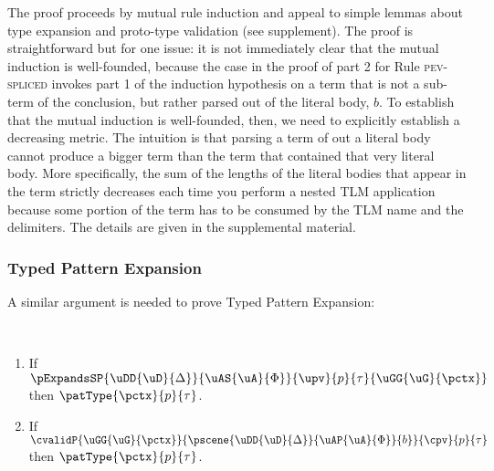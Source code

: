 \documentclass[acmsmall,10pt,review,anonymous]{acmart}\settopmatter{printfolios=true}
\begin{document}
The proof proceeds by mutual rule induction and appeal to simple lemmas about type expansion and proto-type validation (see supplement). The proof is straightforward but for one issue: it is not immediately clear that the mutual induction is well-founded, because the case in the proof of part 2 for Rule \textsc{pev-spliced} invokes part 1 of the induction hypothesis on a term that is not a sub-term of the conclusion, but rather parsed out of the literal body, $b$. To establish that the mutual induction is well-founded, then, we need to explicitly establish a decreasing metric. The intuition is that parsing a term of out a literal body cannot produce a bigger term than the term that contained that very literal body. More specifically, {the sum of the lengths of the literal bodies that appear in the term strictly decreases each time you perform a nested TLM application} because some portion of the term has to be consumed by the TLM name and the delimiters. The details are given in the supplemental material.

\subsubsection{Typed Pattern Expansion} A similar argument is needed to prove Typed Pattern Expansion:
\begin{theorem} ~
\begin{enumerate}[nolistsep]
  \item If $\pExpandsSP{\uDD{\uD}{\Delta}}{\uAS{\uA}{\Phi}}{\upv}{p}{\tau}{\uGG{\uG}{\pctx}}$ then $\patType{\pctx}{p}{\tau}$.
  \item If $\cvalidP{\uGG{\uG}{\pctx}}{\pscene{\uDD{\uD}{\Delta}}{\uAP{\uA}{\Phi}}{b}}{\cpv}{p}{\tau}$ then $\patType{\pctx}{p}{\tau}$.
\end{enumerate}
\end{theorem}
\end{document}
